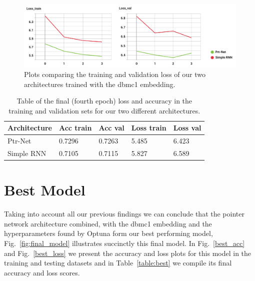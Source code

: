 \begin{figure}[!ht]
\centerline{\includegraphics[width=1.1\textwidth]{figuras/arquiteturas_-Loss.png}   }
\caption{Plots comparing the training and validation loss of our two architectures trained with the dbmc1 embedding.}
\label{arq_loss}
\end{figure}

\begin{table}[]
\begin{tabular}{l|llll}
Architecture & Acc train & Acc val & Loss train & Loss val \\ \hline
Ptr-Net      & 0.7296    & 0.7263  & 5.485      & 6.423    \\
Simple RNN   & 0.7105    & 0.7115  & 5.827      & 6.589   
\end{tabular}
\caption{Table of the final (fourth epoch) loss and accuracy in the training and validation sets for our two different architectures.}
\label{table:arq}
\end{table}

\section{Best Model}

Taking into account all our previous findings we can conclude that the pointer network architecture combined, with the dbmc1 embedding and the hyperparameters found by Optuna form our best performing model, Fig.~\ref{fig:final_model} illustrates succinctly this final model.  In Fig.~\ref{best_acc} and Fig.~\ref{best_loss} we present the accuracy and loss plots for this model in the training and testing datasets and in Table~\ref{table:best} we compile its final accuracy and loss scores.


